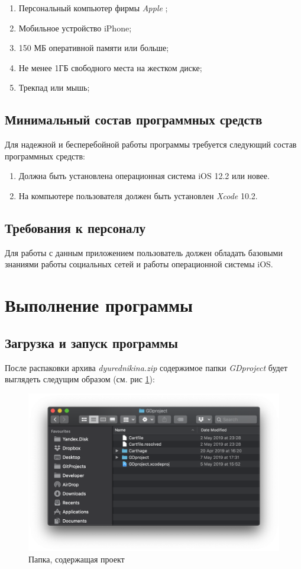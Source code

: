 \documentclass[a4paper,12pt]{article}
\begin{document}
	\begin{enumerate}
		\item Персональный компьютер фирмы \textit{Apple} ;
		\item Мобильное устройство iPhone;
		\item 150 МБ оперативной памяти или больше;
		\item Не менее 1ГБ свободного места на жестком диске;
		\item Трекпад или мышь;
	\end{enumerate}

	\subsection{Минимальный состав программных средств}
	Для надежной и бесперебойной работы программы требуется следующий состав программных средств:
	\begin{enumerate}
		\item Должна быть установлена операционная система iOS 12.2 или новее. \item На компьютере пользователя должен быть установлен \textit{Xcode} 10.2.
	\end{enumerate}
	\subsection{Требования к персоналу}
	Для работы с данным приложением пользователь должен обладать базовыми знаниями работы социальных сетей и работы операционной системы iOS.
	
	\newpage 
	\section{Выполнение программы}
	\subsection{Загрузка и запуск программы}
	После распаковки архива \textit{dyurednikina.zip} содержимое папки \textit{GDproject} будет выглядеть следущим образом (см. рис \ref{pic: Folder}):
		\begin{figure}[h]
		\centering
		\includegraphics[width = \linewidth]{../includes/ro/folder.png}
		\caption{Папка, содержащая проект}
		\label{pic: Folder}
	\end{figure}
\end{document}
